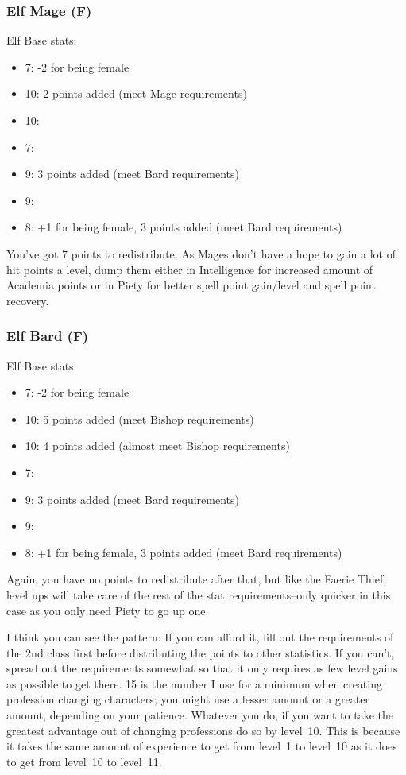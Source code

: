\documentclass[12pt]{article}
\providecommand{\tightlist}{%
  \setlength{\itemsep}{0pt}\setlength{\parskip}{0pt}}
\begin{document}
\subsubsection{Elf Mage (F)}
\label{sec:elf-mage-f}

Elf Base stats:

\begin{itemize}
\tightlist
\item
  7: -2 for being female
\item
  10: 2 points added (meet Mage requirements)
\item
  10:
\item
  7:
\item
  9: 3 points added (meet Bard requirements)
\item
  9:
\item
  8: +1 for being female, 3 points added (meet Bard requirements)
\end{itemize}

You've got 7 points to redistribute. As Mages don't have a hope to gain
a lot of hit points a level, dump them either in Intelligence for
increased amount of Academia points or in Piety for better spell point
gain\fshyp{}level and spell point recovery.

\subsubsection{Elf Bard (F)}
\label{sec:elf-bard-f}

Elf Base stats:

\begin{itemize}
\tightlist
\item
  7: -2 for being female
\item
  10: 5 points added (meet Bishop requirements)
\item
  10: 4 points added (almost meet Bishop requirements)
\item
  7:
\item
  9: 3 points added (meet Bard requirements)
\item
  9:
\item
  8: +1 for being female, 3 points added (meet Bard requirements)
\end{itemize}

Again, you have no points to redistribute after that, but like the
Faerie Thief, level ups will take care of the rest of the stat
requirements--only quicker in this case as you only need Piety to go up
one.

I think you can see the pattern: If you can afford it, fill out the
requirements of the 2nd class first before distributing the points to
other statistics. If you can't, spread out the requirements somewhat so
that it only requires as few level gains as possible to get there. 15 is
the number I use for a minimum when creating profession changing
characters; you might use a lesser amount or a greater amount, depending
on your patience. Whatever you do, if you want to take the greatest
advantage out of changing professions do so by level~10. This is because
it takes the same amount of experience to get from level~1 to level~10
as it does to get from level~10 to level~11.
\end{document}
